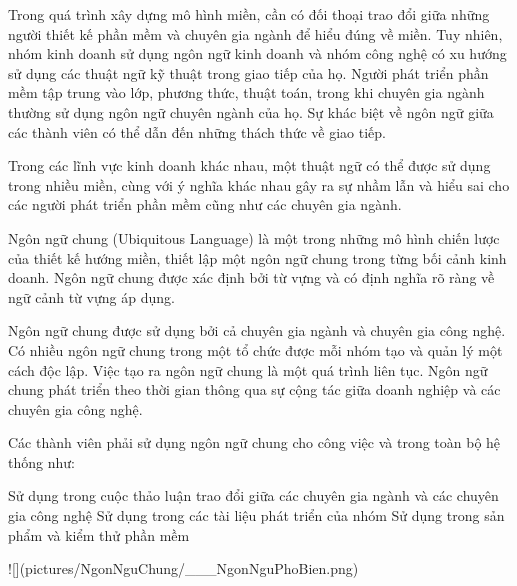 
Trong quá trình xây dựng mô hình miền, cần có đối thoại trao đổi giữa những người thiết kế phần mềm và chuyên gia ngành để hiểu đúng về miền. Tuy nhiên, nhóm kinh doanh sử dụng ngôn ngữ kinh doanh và nhóm công nghệ có xu hướng sử dụng các thuật ngữ kỹ thuật trong giao tiếp của họ. Người phát triển phần mềm tập trung vào lớp, phương thức, thuật toán, trong khi chuyên gia ngành thường sử dụng ngôn ngữ chuyên ngành của họ. Sự khác biệt về ngôn ngữ giữa các thành viên có thể dẫn đến những thách thức về giao tiếp.

Trong các lĩnh vực kinh doanh khác nhau, một thuật ngữ có thể được sử dụng trong nhiều miền, cùng với ý nghĩa khác nhau gây ra sự nhầm lẫn và hiểu sai cho các người phát triển phần mềm cũng như các chuyên gia ngành.


Ngôn ngữ chung (Ubiquitous Language) là một trong những mô hình chiến lược của thiết kế hướng miền, thiết lập một ngôn ngữ chung trong từng bối cảnh kinh doanh.
Ngôn ngữ chung được xác định bởi từ vựng và có định nghĩa rõ ràng về ngữ cảnh từ vựng áp dụng.


Ngôn ngữ chung được sử dụng bởi cả chuyên gia ngành và chuyên gia công nghệ.
Có nhiều ngôn ngữ chung trong một tổ chức được mỗi nhóm tạo và quản lý một cách độc lập.
Việc tạo ra ngôn ngữ chung là một quá trình liên tục. Ngôn ngữ chung phát triển theo thời gian thông qua sự cộng tác giữa doanh nghiệp và các chuyên gia công nghệ.

Các thành viên phải sử dụng ngôn ngữ chung cho công việc và trong toàn bộ hệ thống như:

Sử dụng trong cuộc thảo luận trao đổi giữa các chuyên gia ngành và các chuyên gia công nghệ
Sử dụng trong các tài liệu phát triển của nhóm
Sử dụng trong sản phẩm và kiểm thử phần mềm

![](pictures/NgonNguChung/___NgonNguPhoBien.png)


